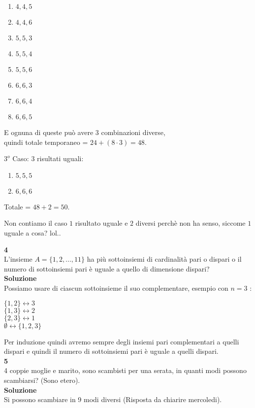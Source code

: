 \documentclass[11pt]{article}
\begin{document}
			\begin{enumerate}
				\item $4,4,5$
				\item $4,4,6$
				\item $5,5,3$
				\item $5,5,4$
				\item $5,5,6$
				\item $6,6,3$
				\item $6,6,4$
				\item $6,6,5$

			\end{enumerate}

            E ognuna di queste pu\`o avere $3$ combinazioni diverse, \\quindi totale temporaneo = $24 + (8 \cdot 3) = 48$.

            $3^o$ Caso: $3$ risultati uguali:
			
			\begin{enumerate}
				\item  $5,5,5$
				\item  $6,6,6$
			\end{enumerate}

            Totale = $48 + 2 = 50$.

            Non contiamo il caso $1$ risultato uguale e $2$ diversi perchè non ha senso, siccome $1$ uguale a cosa? lol..

            \textbf{\large 4}\\
            L'insieme $A = \{1,2,...,11\}$ ha più sottoinsiemi di cardinalit\`a pari o dispari o il numero di sottoinsiemi pari è uguale a quello di dimensione dispari?\\
            \textbf{\large Soluzione}\\
            Possiamo usare di ciascun sottoinsieme il suo complementare, esempio con $n = 3$ :
            \begin{center}
           		$\{1,2\} \longleftrightarrow 3$\\
            	$\{1,3\} \longleftrightarrow 2$\\
            	$\{2,3\} \longleftrightarrow 1$\\
            	$\emptyset \longleftrightarrow \{1,2,3\}$\\
            \end{center}
            Per induzione quindi avremo sempre degli insiemi pari complementari a quelli dispari e quindi il numero di sottoinsiemi pari è uguale a quelli dispari.\\
            \textbf{\large 5}\\
            4 coppie moglie e marito, sono scambisti per una serata, in quanti modi possono scambiarsi? (Sono etero).\\
            \textbf{\large Soluzione}\\
            Si possono scambiare in 9 modi diversi (Risposta da chiarire mercoledi).
            \\
\end{document}
